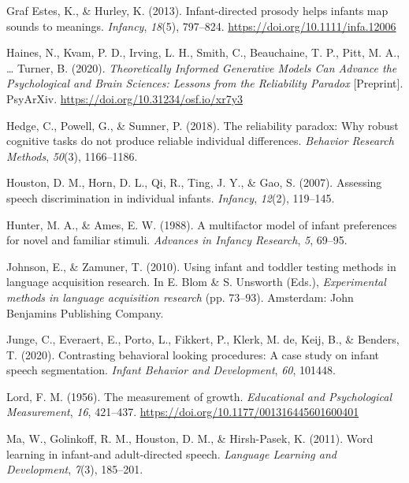 \documentclass[
  english,
  man,floatsintext]{apa6}
\newlength{\cslhangindent}
\newlength{\cslentryspacingunit} %
\newenvironment{CSLReferences}[2] %
 {%
  \setlength{\parindent}{0pt}
  \ifodd #1
  \let\oldpar\par
  \def\par{\hangindent=\cslhangindent\oldpar}
  \fi
  \setlength{\parskip}{#2\cslentryspacingunit}
 }%
 {}
\begin{document}
\begin{CSLReferences}{1}{0}
\leavevmode{}%
Graf Estes, K., \& Hurley, K. (2013). Infant-directed prosody helps infants map sounds to meanings. \emph{Infancy}, \emph{18}(5), 797--824. \url{https://doi.org/10.1111/infa.12006}

\leavevmode{}%
Haines, N., Kvam, P. D., Irving, L. H., Smith, C., Beauchaine, T. P., Pitt, M. A., \ldots{} Turner, B. (2020). \emph{Theoretically {Informed} {Generative} {Models} {Can} {Advance} the {Psychological} and {Brain} {Sciences}: {Lessons} from the {Reliability} {Paradox}} {[}Preprint{]}. PsyArXiv. \url{https://doi.org/10.31234/osf.io/xr7y3}

\leavevmode{}%
Hedge, C., Powell, G., \& Sumner, P. (2018). The reliability paradox: Why robust cognitive tasks do not produce reliable individual differences. \emph{Behavior Research Methods}, \emph{50}(3), 1166--1186.

\leavevmode{}%
Houston, D. M., Horn, D. L., Qi, R., Ting, J. Y., \& Gao, S. (2007). Assessing speech discrimination in individual infants. \emph{Infancy}, \emph{12}(2), 119--145.

\leavevmode{}%
Hunter, M. A., \& Ames, E. W. (1988). A multifactor model of infant preferences for novel and familiar stimuli. \emph{Advances in Infancy Research}, \emph{5}, 69--95.

\leavevmode{}%
Johnson, E., \& Zamuner, T. (2010). Using infant and toddler testing methods in language acquisition research. In E. Blom \& S. Unsworth (Eds.), \emph{Experimental methods in language acquisition research} (pp. 73--93). Amsterdam: John Benjamins Publishing Company.

\leavevmode{}%
Junge, C., Everaert, E., Porto, L., Fikkert, P., Klerk, M. de, Keij, B., \& Benders, T. (2020). Contrasting behavioral looking procedures: A case study on infant speech segmentation. \emph{Infant Behavior and Development}, \emph{60}, 101448.

\leavevmode{}%
Lord, F. M. (1956). The measurement of growth. \emph{Educational and Psychological Measurement}, \emph{16}, 421--437. \url{https://doi.org/10.1177/001316445601600401}

\leavevmode{}%
Ma, W., Golinkoff, R. M., Houston, D. M., \& Hirsh-Pasek, K. (2011). Word learning in infant-and adult-directed speech. \emph{Language Learning and Development}, \emph{7}(3), 185--201.


\end{CSLReferences}
\end{document}
